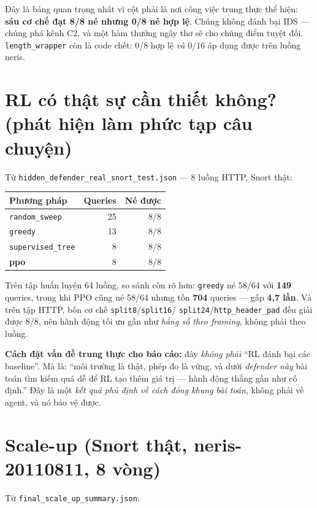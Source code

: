 \documentclass[12pt,a4paper]{report}
\begin{document}
Đây là bảng quan trọng nhất vì cột phải là nơi công việc trung thực thể hiện:
\textbf{sáu cơ chế đạt 8/8 né nhưng 0/8 né hợp lệ}. Chúng không đánh bại IDS — chúng
phá kênh C2, và một hàm thưởng ngây thơ sẽ cho chúng điểm tuyệt đối.
\texttt{length\_wrapper} còn là code chết: 0/8 hợp lệ \emph{và} 0/16 áp dụng được trên
luồng neris.

\section{RL có thật sự cần thiết không? (phát hiện làm phức tạp câu chuyện)}

Từ \texttt{hidden\_defender\_real\_snort\_test.json} — 8 luồng HTTP, Snort thật:

\begin{center}
\begin{tabular}{lrr}
\toprule
Phương pháp & Queries & Né được \\
\midrule
\texttt{random\_sweep}    & 25 & 8/8 \\
\texttt{greedy}           & 13 & 8/8 \\
\texttt{supervised\_tree} & 8  & 8/8 \\
\textbf{ppo}              & 8  & 8/8 \\
\bottomrule
\end{tabular}
\end{center}

Trên tập huấn luyện 64 luồng, so sánh còn rõ hơn: \texttt{greedy} né 58/64 với
\textbf{149} queries, trong khi PPO cũng né 58/64 nhưng tốn \textbf{704} queries —
gấp \textbf{4{,}7 lần}. Và trên tập HTTP, bốn cơ chế \texttt{split8}/\texttt{split16}/
\texttt{split24}/\texttt{http\_header\_pad} đều giải được 8/8, nên hành động tối ưu
gần như \emph{hằng số theo framing}, không phải theo luồng.

\textbf{Cách đặt vấn đề trung thực cho báo cáo:} đây \emph{không phải} ``RL đánh bại
các baseline''. Mà là: ``môi trường là thật, phép đo là vững, và dưới \emph{defender
này} bài toán tìm kiếm quá dễ để RL tạo thêm giá trị — hành động thắng gần như cố
định.'' Đây là một \emph{kết quả phủ định về cách đóng khung bài toán}, không phải về
agent, và nó bảo vệ được.

\section{Scale-up (Snort thật, neris-20110811, 8 vòng)}

Từ \texttt{final\_scale\_up\_summary.json}:
\end{document}
